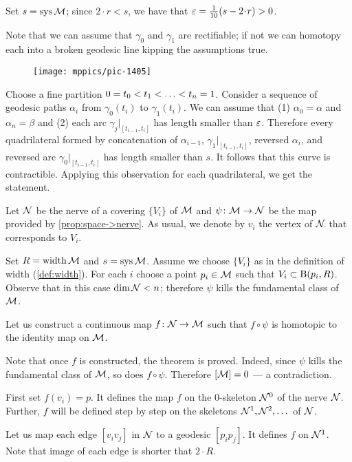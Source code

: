 Set $s=\mathop{\rm sys}\nolimits\mathcal{M}$; 
since $2\cdot r<s$, we have that $\eps=\tfrac1{10}(s-2\cdot r)>0$.

Note that we can assume that $\gamma_0$ and $\gamma_1$ are rectifiable;
if not we can homotopy each into a broken geodesic line kipping the assumptions true. 

\begin{wrapfigure}{r}{34mm}
\vskip-0mm
\centering
\texttt{[image: mppics/pic-1405]}
\end{wrapfigure}

Choose a fine partition $0\z=t_0\z<t_1\z<\z\dots\z<t_n=1$.
Consider a sequence of geodesic paths $\alpha_i$ from $\gamma_0(t_i)$ to $\gamma_1(t_i)$.
We can assume that (1) $\alpha_0=\alpha$ and $\alpha_n=\beta$ and (2) each arc $\gamma_j|_{[t_{i-1},t_i]}$ has length smaller than $\varepsilon$.
Therefore every quadrilateral formed by concatenation  of $\alpha_{i-1}$, $\gamma_1|_{[t_{i-1},t_i]}$, reversed $\alpha_i$, and reversed arc $\gamma_0|_{[t_{i-1},t_i]}$ has length smaller than $s$.
It follows that this curve is contractible.
Applying this observation for each quadrilateral, we get the statement.
\qeds


Let $\mathcal{N}$ be the nerve of a covering $\{V_i\}$ of $\mathcal{M}$ and $\psi\colon\mathcal{M}\to\mathcal{N}$ be the map provided by \ref{prop:space->nerve}.
As usual, we denote by $v_i$ the vertex of $\mathcal{N}$ that corresponds to $V_i$.

Set $R=\operatorname{\rm width}\nolimits \mathcal{M}$ and $s=\mathop{\rm sys}\nolimits\mathcal{M}$.
Assume we choose $\{V_i\}$ as in the definition of width (\ref{def:width}).
For each $i$ choose a point $p_i\in \mathcal{M}$ such that $V_i\subset \mathrm{B}{}(p_i,R)$.
Observe that in this case $\operatorname{\rm dim}\nolimits\mathcal{N}<n$;
therefore $\psi$ kills the fundamental class of $\mathcal{M}$.

Let us construct a continuous map  $f\colon\mathcal{N}\to  \mathcal{M}$ such that
$f\circ\psi$ is homotopic to the identity map on $\mathcal{M}$.

Note that once $f$ is constructed, the theorem is proved.
Indeed, since $\psi$ kills the fundamental class of $\mathcal{M}$, so does $f\circ\psi$.
Therefore $[\mathcal{M}]=0$ --- a contradiction.

First set $f(v_i)=p$.
It defines the map $f$ on the 0-skeleton $\mathcal{N}^0$ of the nerve $\mathcal{N}$.
Further, $f$ will be defined step by step on the skeletons $\mathcal{N}^1,\mathcal{N}^2, \dots$ of $\mathcal{N}$.

Let us map each edge $[v_iv_j]$ in $\mathcal{N}$ to a geodesic $[p_ip_j]$.
It defines $f$ on $\mathcal{N}^1$.
Note that image of each edge is shorter that $2\cdot R$.

